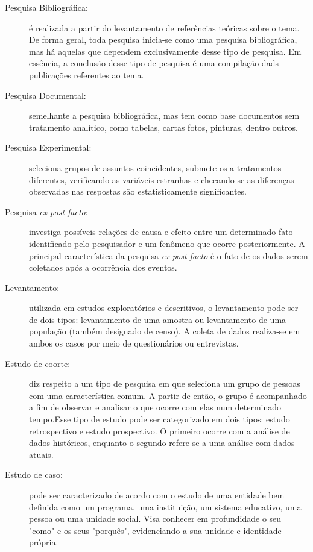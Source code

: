 \begin{description}
\item[Pesquisa Bibliográfica:] é realizada a partir do levantamento de referências teóricas sobre o tema. De forma geral, toda pesquisa inicia-se como uma pesquisa bibliográfica, mas há aquelas que dependem exclusivamente desse tipo de pesquisa. Em essência, a conclusão desse tipo de pesquisa é uma compilação dads publicações referentes ao tema. 

\item[Pesquisa Documental:] semelhante a pesquisa bibliográfica, mas tem como base documentos sem tratamento analítico, como tabelas, cartas fotos, pinturas, dentro outros. 

\item[Pesquisa Experimental:] seleciona grupos de assuntos coincidentes, submete-os a tratamentos diferentes, verificando as variáveis estranhas e checando se as diferenças observadas nas respostas são estatisticamente significantes.

\item[Pesquisa \textit{ex-post facto}:] investiga possíveis relações de causa e efeito entre um determinado fato identificado pelo pesquisador e um fenômeno que ocorre posteriormente. A principal característica da pesquisa \textit{ex-post facto} é o fato de os dados serem coletados após a ocorrência dos eventos.

\item[Levantamento:] utilizada em estudos exploratórios e descritivos, o levantamento pode ser de dois tipos: levantamento de uma amostra ou levantamento de uma população (também designado de censo). A coleta de dados realiza-se em ambos os casos por meio de questionários ou entrevistas.

\item[Estudo de coorte:] diz respeito a um tipo de pesquisa em que seleciona um grupo de pessoas com uma característica comum. A partir de então, o grupo é acompanhado a fim de observar e analisar o que ocorre com elas num determinado tempo.Esse tipo de estudo pode ser categorizado em dois tipos: estudo retrospectivo e estudo prospectivo. O primeiro ocorre com a análise de dados históricos, enquanto o segundo refere-se a uma análise com dados atuais.   

\item[Estudo de caso:] pode ser caracterizado de acordo com o estudo de uma entidade bem definida como um programa, uma instituição, um sistema educativo, uma pessoa ou uma unidade social. Visa conhecer em profundidade o seu "como" e os seus "porquês", evidenciando a sua unidade e identidade própria. 


\end{description}
